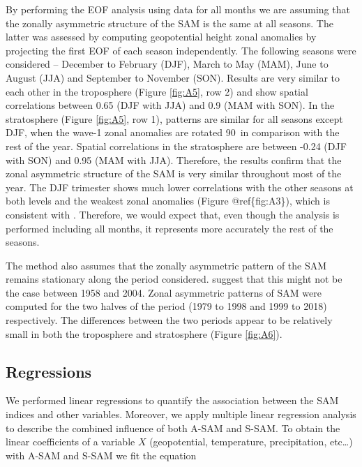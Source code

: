 \documentclass[smallextended]{svjour3}       %
\begin{document}
By performing the EOF analysis using data for all months we are assuming that the zonally asymmetric structure of the SAM is the same at all seasons.
The latter was assessed by computing geopotential height zonal anomalies by projecting the first EOF of each season independently.
The following seasons were considered -- December to February (DJF), March to May (MAM), June to August (JJA) and September to November (SON).
Results are very similar to each other in the troposphere (Figure \ref{fig:A5}, row 2) and show spatial correlations between 0.65 (DJF with JJA) and 0.9 (MAM with SON).
In the stratosphere (Figure \ref{fig:A5}, row 1), patterns are similar for all seasons except DJF, when the wave-1 zonal anomalies are rotated 90\degree~in comparison with the rest of the year.
Spatial correlations in the stratosphere are between -0.24 (DJF with SON) and 0.95 (MAM with JJA).
Therefore, the results confirm that the zonal asymmetric structure of the SAM is very similar throughout most of the year.
The DJF trimester shows much lower correlations with the other seasons at both levels and the weakest zonal anomalies (Figure @ref\{fig:A3\}), which is consistent with \citet{fogt2020}.
Therefore, we would expect that, even though the analysis is performed including all months, it represents more accurately the rest of the seasons.

The method also assumes that the zonally asymmetric pattern of the SAM remains stationary along the period considered.
\citet{silvestri2009} suggest that this might not be the case between 1958 and 2004.
Zonal asymmetric patterns of SAM were computed for the two halves of the period (1979 to 1998 and 1999 to 2018) respectively.
The differences between the two periods appear to be relatively small in both the troposphere and stratosphere (Figure \ref{fig:A6}).

\hypertarget{regressions}{%
\subsection{Regressions}\label{regressions}}

We performed linear regressions to quantify the association between the SAM indices and other variables.
Moreover, we apply multiple linear regression analysis to describe the combined influence of both A\nobreakdash-SAM and S\nobreakdash-SAM.
To obtain the linear coefficients of a variable \(X\) (geopotential, temperature, precipitation, etc\ldots) with A\nobreakdash-SAM and S\nobreakdash-SAM we fit the equation
\end{document}
